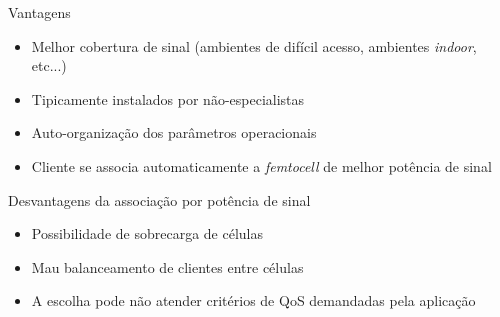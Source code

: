 \begin{frame}
  \begin{block}{Vantagens}
    \begin{itemize}
      \item Melhor cobertura de sinal (ambientes de difícil acesso, ambientes
      \textit{indoor}, etc...)
      \item Tipicamente instalados por não-especialistas
      \item Auto-organização dos parâmetros operacionais
      \item Cliente se associa automaticamente a \textit{femtocell} de melhor
      potência de sinal
    \end{itemize}
  \end{block}

  \begin{block}{Desvantagens da associação por potência de sinal}
    \begin{itemize}
      \item Possibilidade de sobrecarga de células
      \item Mau balanceamento de clientes entre células
      \item A escolha pode não atender critérios de QoS demandadas pela
      aplicação
    \end{itemize}
  \end{block}
\end{frame}




